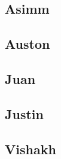 

\newcommand{\Multiview}[1]{
 \subsection{#1}
  
 \clearpage
}

\Multiview{Asimm}
\Multiview{Auston}
\Multiview{Juan}
\Multiview{Justin}
\Multiview{Vishakh}
